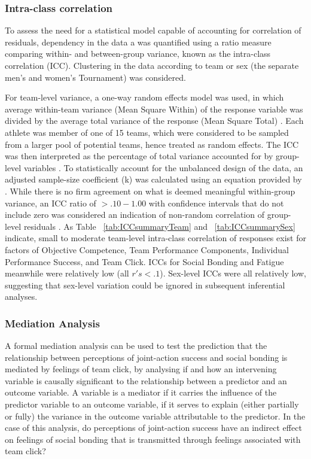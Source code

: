 \subsubsection{Intra-class correlation\label{app8:ICC}}
To assess the need for a statistical model capable of accounting for correlation of residuals, dependency in the data a was quantified using a ratio measure comparing within- and between-group variance, known as the intra-class correlation (ICC). Clustering in the data according to team or sex (the separate men's and women's Tournament) was considered.

For team-level variance, a one-way random effects model was used, in which average within-team variance (Mean Square Within) of the response variable was divided by the average total variance of the response (Mean Square Total) \citep{Field2005a}.  Each athlete was member of one of 15 teams, which were considered to be sampled from a larger pool of potential teams, hence treated as random effects. The ICC was then interpreted as the percentage of total variance accounted for by group-level variables \citep{Wolak2012}.
To statistically account for the unbalanced design of the data, an adjusted sample-size coefficient (k) was calculated using an equation provided by \citep{Lessells1987}.  While there is no firm agreement on what is deemed meaningful within-group variance, an ICC ratio of $>.10-1.00$ with confidence intervals that do not include zero was considered an indication of non-random correlation of group-level residuals \citep{Bailey2011}. As Table ~\ref{tab:ICCsummaryTeam} and ~\ref{tab:ICCsummarySex} indicate, small to moderate team-level intra-class correlation of responses exist for factors of Objective Competence, Team Performance Components, Individual Performance Success, and Team Click.  ICCs for Social Bonding and Fatigue meanwhile were relatively low (all $r's <.1$). Sex-level ICCs were all relatively low, suggesting that sex-level variation could be ignored in subsequent inferential analyses.\\



\subsubsection{Mediation Analysis\label{app8:mediationAnalysis}}
A formal mediation analysis can be used to test the prediction that the relationship between perceptions of joint-action success and social bonding is mediated by feelings of team click, by analysing if and how an intervening variable is causally significant to the relationship between a predictor and an outcome variable. A variable is a mediator if it carries the influence of the predictor variable to an outcome variable, if it serves to explain (either partially or fully) the variance in the outcome variable attributable to the predictor. In the case of this analysis, do perceptions of joint-action success have an indirect effect on feelings of social bonding that is transmitted through feelings associated with team click?

